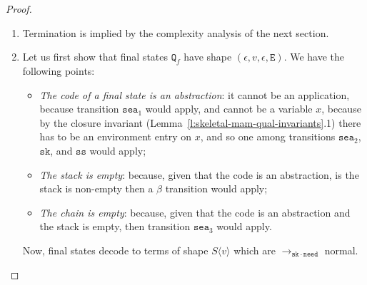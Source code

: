 \documentclass[10pt,a4paper]{article}
\theoremstyle{remark}
\newcommand{\tm}{t}
\newcommand{\var}{x}
\newcommand{\Rew}[1]{\rightarrow_{#1}}
\newcommand{\symfont}[1]{\mathtt{#1}}
\newcommand{\sksym}{\symfont{sk}}
\newcommand{\val}{v}
\newcommand{\ctxholep}[1]{\langle #1\rangle}
\newcommand{\sctx}{S}
\newcommand{\sctxp}[1]{\sctx\ctxholep{#1}}
\newcommand{\esub}[2]{[#1{\shortleftarrow}#2]}
\newcommand{\reflemma}[1]{Lemma~\ref{l:#1}}
\newcommand{\env}{\genv}
\newcommand{\envtwo}{\env'}
\newcommand{\genv}{\symfont{E}}
\newcommand{\stack}{\symfont{S}}
\renewcommand{\state}{\symfont{Q}}
\newcommand{\state}{\symfont{Q}}
\newcommand{\statetwo}{\state'}
\newcommand{\decode}[1]{\underline{#1}}
\newcommand{\decodep}[2]{\decode{#1}\ctxholep{#2}}
\newcommand{\stempty}{\epsilon}
\newcommand{\cons}{::}
\newcommand{\tomachhole}[1]{\leadsto_{#1}}
\newcommand{\seasym}{\symfont{sea}}
\newcommand{\tomachseatwo}{\tomachhole{\seasym_2}}
\newcommand{\tomachseathree}{\tomachhole{\seasym_3}}
\newcommand{\emptylist}{\epsilon}
\newcommand{\chain}{\symfont{C}}
\newcommand{\sssym}{\symfont{ss}}
\newcommand{\skneedsym}{\sksym{\cdot}\symfont{need}}
\newcommand{\toskneed}{\Rew{\skneedsym}}
\newcommand{\fourstate}[4]{(#1,#2,#3,#4)}
\renewcommand{\cons}{{:}}
\begin{document}
\begin{proof}
\begin{enumerate}
\begin{enumerate}
\item If $\state = \fourstate \chain \var \stack {\env\cons\esub\var\tm\cons\envtwo}
	  	\tomachseatwo 
	  	\fourstate {\chain\cons(\var, \stack, \env\esub\var\cdot)} \tm \stempty \envtwo  = \statetwo$ then:
\[\begin{array}{lllllllll}
 \decode{\fourstate \chain \var \stack {\env\cons\esub\var\tm\cons\envtwo}}
 & = &
 \decodep{\env\cons\esub\var\tm\cons\envtwo}{\decodep\chain{\decodep\stack{\var}}}
\\ & = &
 \decodep{\envtwo}{\decodep\env{\decodep\chain{\decodep\stack\var}}\esub\var\tm}
 & = &		
	\decode{\fourstate {\chain\cons(\var, \stack, \env\esub\var\cdot)} \tm \stempty \envtwo}.
\end{array}\]

\item If $\state = \fourstate {\chain\cons(\var, \stack, \env\esub\var\cdot)} \val \stempty \envtwo
		 \tomachseathree 
		\fourstate \chain \var \stack {\env\cons\esub\var{\val}\cons\envtwo} = \statetwo$ then:
\[\begin{array}{lllllllll}
 \decode{\fourstate {\chain\cons(\var, \stack, \env\esub\var\cdot)} \val \stempty \envtwo}
 & = &
 \decodep{\envtwo}{\decodep\env{\decodep\chain{\decodep\stack\var}}\esub\var\val}
\\ & = &
\decodep{\env\cons\esub\var\val\cons\envtwo}{\decodep\chain{\decodep\stack{\var}}}
 & = &		
	\decode{\fourstate \chain \var \stack {\env\cons\esub\var\val\cons\envtwo}}.
\end{array}\]
\end{enumerate}

\item Termination is implied by the complexity analysis of the next section.
\item Let us first show that final states $\state_f$ have shape $\fourstate\emptylist\val\emptylist\env$. We have the following points:
\begin{itemize}
\item \emph{The code of a final state is an abstraction}: it cannot be an application, because transition $\seasym_1$ would apply, and cannot be a variable $\var$, because by the closure invariant (\reflemma{skeletal-mam-qual-invariants}.1) there has to be an environment entry on $\var$, and so one among transitions $\seasym_2$, $\sksym$, and $\sssym$ would apply;
\item \emph{The stack is empty}: because, given that the code is an abstraction, is the stack is non-empty then a $\beta$ transition would apply;
\item \emph{The chain is empty}: because, given that the code is an abstraction and the stack is empty, then transition $\seasym_3$ would apply.
\end{itemize}
Now, final states decode to terms of shape $\sctxp\val$ which are $\toskneed$ normal.
\qedhere
\end{enumerate}
\end{proof}
\end{document}
